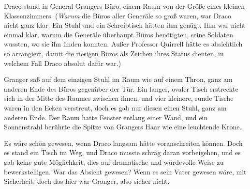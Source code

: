 Draco stand in General Grangers Büro, einem Raum von der Größe eines kleinen Klassenzimmers. (\emph{Warum} die Büros aller Generäle so groß waren, war Draco nicht ganz klar. Ein Stuhl und ein Schreibtisch hätten ihm genügt. Ihm war nicht einmal klar, warum die Generäle überhaupt Büros benötigten, seine Soldaten wussten, wo sie ihn finden konnten. Außer Professor Quirrell hätte es absichtlich so arrangiert, damit die riesigen Büros als Zeichen ihres Status dienten, in welchem Fall Draco absolut dafür war.)

Granger saß auf dem einzigen Stuhl im Raum wie auf einem Thron, ganz am anderen Ende des Büros gegenüber der Tür. Ein langer, ovaler Tisch erstreckte sich in der Mitte des Raumes zwischen ihnen, und vier kleinere, runde Tische waren in den Ecken verstreut, doch es gab nur diesen einen Stuhl, ganz am anderen Ende. Der Raum hatte Fenster entlang einer Wand, und ein Sonnenstrahl berührte die Spitze von Grangers Haar wie eine leuchtende Krone.

Es wäre schön gewesen, wenn Draco langsam hätte voranschreiten können. Doch es stand ein Tisch im Weg, und Draco musste schräg daran vorbeigehen, und es gab keine gute Möglichkeit, dies auf dramatische und würdevolle Weise zu bewerkstelligen. War das Absicht gewesen? Wenn es sein Vater gewesen wäre, mit Sicherheit; doch das hier war Granger, also sicher nicht.

